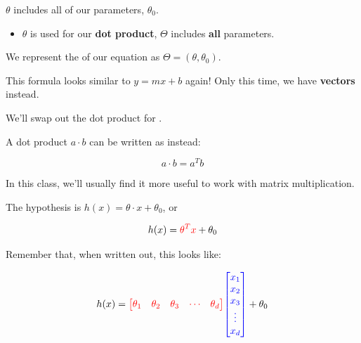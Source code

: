         $\theta$ includes all of our parameters,  $\theta_0$.
        
        \begin{itemize}
            \item $\theta$ is used for our \textbf{dot product}, $\Theta$ includes \textbf{all} parameters.\\
        \end{itemize}
        
        \begin{notation}
            We represent the  of our  equation as $\Theta = (\theta, \theta_0)$.
        \end{notation}
        
        This formula looks similar to $y=mx+b$ again! Only this time, we have \textbf{vectors} instead.
        
        We'll swap out the dot product for .\\

        \begin{kequation}
            A dot product $a \cdot b$ can be written as  instead:

            \begin{equation*}
                a \cdot b = a^Tb
            \end{equation*}
        \end{kequation}
        
        In this class, we'll usually find it more useful to work with matrix multiplication.\\
        
        \begin{definition}
            The  hypothesis is  $h(x)=\theta \cdot x+\theta_0$, or
            
            \begin{equation*}
                h(x) = \textcolor{red}{ \theta^T x } + \theta_0
            \end{equation*}
        \end{definition}
        
        
        Remember that, when written out, this looks like:
        
        \begin{equation}
            h(x) = 
            \textcolor{red}{
                \begin{bmatrix}
                    \theta_1 & \theta_2 & \theta_3 & \cdots & \theta_d
                \end{bmatrix}
            }
            \textcolor{blue}{
                \begin{bmatrix}
                    x_1 \\ x_2 \\ x_3 \\ \vdots \\ x_d
                \end{bmatrix}
            }
            + \theta_0
        \end{equation}
        
